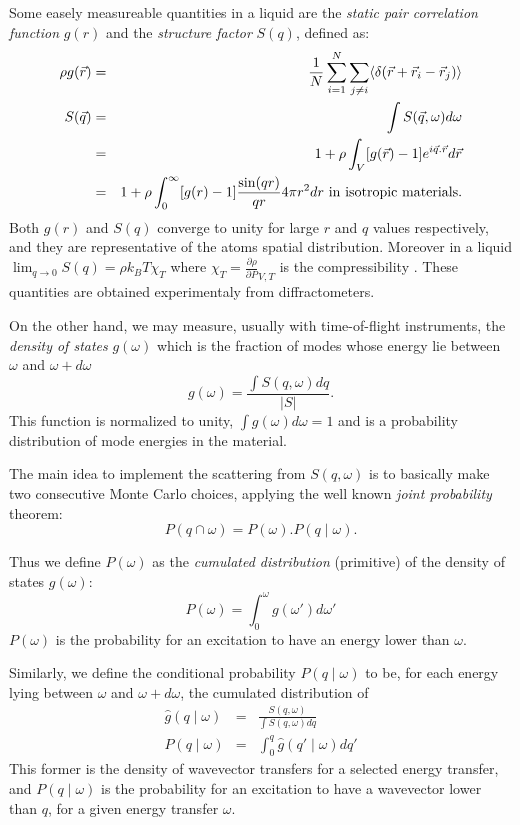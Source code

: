 Some easely measureable quantities in a liquid are the \emph{static pair correlation function} $g(r)$ and the \emph{structure factor} $S(q)$, defined as:
\begin{eqnarray}
\rho g(\vec{r}) &=& \frac{1}{N} \sum_{i=1}^N \sum_{j \neq i} \langle \delta(\vec{r}+\vec{r}_i-\vec{r}_j) \rangle \\
S(\vec{q}) &=&\int S(\vec q,\omega) d\omega \label{eq:sq} \\
           &=&1 + \rho \int_V [g(\vec{r})-1] e^{i\vec{q}.\vec{r}} d\vec{r} \\
           &=&1 + \rho \int_{0}^{\infty} [g(r)-1] \frac{\sin(qr)}{qr} 4 \pi r^2 dr {\rm\ in\ isotropic\ materials.}
\end{eqnarray}
Both $g(r)$ and $S(q)$ converge to unity for large $r$ and $q$ values respectively, and they are representative of the atoms spatial distribution. Moreover in a liquid $\lim_{q \rightarrow 0} S(q) = \rho k_B T \chi_T$ where $\chi_T=\frac{\partial \rho}{\partial P}_{V,T}$ is the compressibility \cite{Egelstaff67}. These quantities are obtained experimentaly from diffractometers.

On the other hand, we may measure, usually with time-of-flight instruments, the \emph{density of states} $g(\omega)$  which is the fraction of modes whose energy lie between $\omega$ and $\omega+d\omega$ \cite{lovesey84}
\begin{equation}
g(\omega) = \frac{\int S(q,\omega) dq}{|S|} .
\end{equation}
This function is normalized to unity, $\int g(\omega) d\omega = 1$ and is a probability distribution of mode energies in the material.

The main idea to implement the scattering from $S(q, \omega)$ is to basically make two consecutive Monte Carlo choices, applying the well known \emph{joint probability} theorem:
\begin{equation}
\label{eq:jointproba}
P(q \cap \omega) = P(\omega).P(q \mid \omega) .
\end{equation}

Thus we define $P(\omega)$ as the \emph{cumulated distribution} (primitive) of the density of states $g(\omega)$:
\begin{equation}\label{eq:Pw}
P(\omega) = \int_0^\omega g(\omega') d\omega'
\end{equation}
$P(\omega)$ is the probability for an excitation to have an energy lower than $\omega$.

Similarly, we define the conditional probability $P(q \mid \omega)$ to be, for each energy lying between $\omega$ and $\omega+d\omega$, the cumulated distribution of
\begin{eqnarray}\label{eq:Pqw}
\hat g(q\mid\omega) &=& \frac{S(q, \omega)}{\int S(q,\omega) dq} \\
P(q \mid \omega)    &=& \int_0^q \hat g(q'\mid\omega) dq'
\end{eqnarray}
This former is the density of wavevector transfers for a selected energy transfer, and
$P(q \mid \omega)$ is the probability for an excitation to have a wavevector lower than $q$, for a given energy transfer $\omega$.

